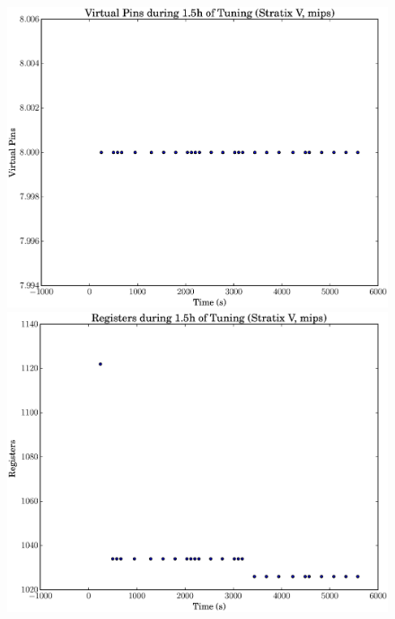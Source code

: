 \documentclass[12pt, a4paper]{article}
\begin{document}
\begin{figure}[htpb]
    \begin{minipage}{.48\textwidth}
        \includegraphics[scale=.25]{mips_pins_5400_chstone_StratixV}
    \end{minipage}%
    \hfill
    \begin{minipage}{.48\textwidth}
        \includegraphics[scale=.25]{mips_regs_5400_chstone_StratixV}
    \end{minipage}%


\end{figure}
\end{document}
